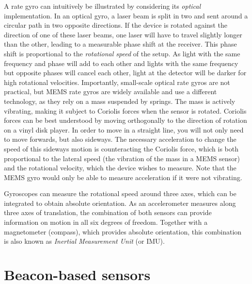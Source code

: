 A rate gyro  can intuitively be illustrated by considering its \textsl{optical} implementation.
In an optical gyro, a laser beam is split in two and sent around a circular path in two opposite directions. If the device is rotated against the direction of one of these laser beams, one laser will have to travel slightly longer than the other, leading to a measurable phase shift at the receiver.
This phase shift is proportional to the \textsl{rotational speed} of the setup. As light with the same frequency and phase will add to each other and lights with the same frequency but opposite phases will cancel each other, light at the detector will be darker for high rotational velocities.
Importantly, small-scale optical rate gyros are not practical, but MEMS rate gyros are widely available and use a different technology, as they rely on a mass suspended by springs. The mass is actively vibrating, making it subject to Coriolis forces when the sensor is rotated. Coriolis forces can be best understood by moving orthogonally to the direction of rotation on a vinyl disk player. In order to move in a straight line, you will not only need to move forwards, but also sideways. The necessary acceleration to change the speed of this sideways motion is counteracting the Coriolis force, which is both proportional to the lateral speed (the vibration of the mass in a MEMS sensor) and the rotational velocity, which the device wishes to measure. Note that the MEMS gyro would only be able to measure acceleration if it were not vibrating.

Gyroscopes can measure the rotational speed around three axes, which can be integrated to obtain absolute orientation. As an accelerometer measures along three axes of translation, the combination of both sensors can provide information on motion in all six degrees of freedom. Together with a magnetometer (compass), which provides absolute orientation, this combination is also known as \textsl{Inertial Measurement Unit} (or IMU).

\section{Beacon-based sensors}

